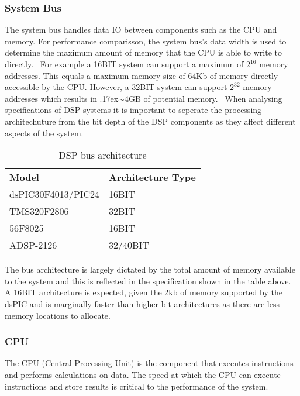 \documentclass[titlepage]{scrartcl}
\begin{document}
    \subsubsection{System Bus}
    The system bus handles data IO between components such as the CPU
    and memory. For performance comparisson, the system bus's data width is
    used to determine the maximum amount of memory that the CPU is able to
    write to directly.~\parencite[p.318]{raf2014fdlm}
    For example a 16BIT system can support a maximum of $2^{16}$ memory
    addresses. This equals a maximum memory size of 64Kb of memory directly
    accessible by the CPU. However, a 32BIT system can support $2^{32}$ memory
    addresses which results in
    {\raise.17ex\hbox{$\scriptstyle\mathtt{\sim}$}}4GB of potential
    memory.~\parencite[p.34]{sd2006mfes}
    When analysing specifications of DSP systems it is important to seperate
    the processing architechuture from the bit depth of the DSP components as
    they affect different aspects of the system.

    \begin{table}[H]
    \centering
    \caption{DSP bus architecture}
    \label{my-label}
    \begin{tabular}{ll}
        \textbf{Model}     & \textbf{Architecture Type}\\
        dsPIC30F4013/PIC24 & 16BIT      \\
        TMS320F2806        & 32BIT     \\
        56F8025            & 16BIT      \\
        ADSP-2126          & 32/40BIT
    \end{tabular}
    \end{table}

    The bus architecture is largely dictated by the total amount of memory
    available to the system and this is reflected in the specification shown in
    the table above. A 16BIT architecture is expected, given the 2kb of memory
    supported by the dsPIC and is marginally faster than higher bit
    architectures as there are less memory locations to allocate. 

    \subsubsection{CPU}\label{CPU}
    The CPU (Central Processing Unit) is the component that executes
    instructions and performs calculations on data. The speed at which the CPU
    can execute instructions and store results is critical to the performance
    of the system.
\end{document}
